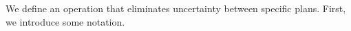 


We define an operation that eliminates uncertainty between specific
plans.  
First,
we introduce some notation.

